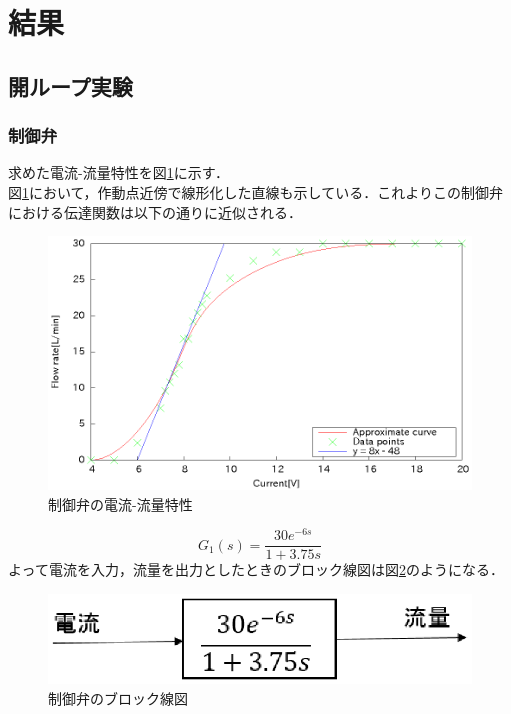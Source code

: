 \documentclass[11pt,a4paper]{jsarticle}
\begin{document}
\section{結果}
  \subsection{開ループ実験}
   \subsubsection{制御弁}
   求めた電流-流量特性を図\ref{fig1}に示す．\\
   図\ref{fig1}において，作動点近傍で線形化した直線も示している．これよりこの制御弁における伝達関数は以下の通りに近似される．

   \begin{figure}
    \begin{center}
     \includegraphics[scale=.7] {./picture/exp1.eps}
     \caption{制御弁の電流-流量特性}
     \label{fig1}
    \end{center}
   \end{figure}

   \begin{equation}
    G_1(s) = \frac{30e^{-6s}}{1+3.75s}
   \end{equation}
   よって電流を入力，流量を出力としたときのブロック線図は図\ref{fig2}のようになる．

   \begin{figure}
    \begin{center}
     \includegraphics[scale=.7] {./picture/blocks_exp1.eps}
     \caption{制御弁のブロック線図}
     \label{fig2}
    \end{center}
   \end{figure}
\end{document}
